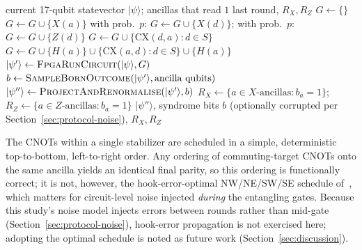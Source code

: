 \documentclass[pdflatex,sn-mathphys,Numbered]{sn-jnl}
\begin{document}
\begin{algorithm}
\caption{One syndrome-extraction round (host-orchestrated, FPGA-executed)}\label{alg:round}
\begin{algorithmic}[1]
\Require current 17-qubit statevector $\lvert\psi\rangle$; ancillas that read $1$ last round, $R_{X}, R_{Z}$
\State $G \gets \{\}$
 
    \State $G \gets G \cup \{X(a)\}$
\EndFor
{}
    \State with prob.\ $p$: $G \gets G \cup \{X(d)\}$; with prob.\ $p$: $G \gets G \cup \{Z(d)\}$ 
\EndFor
{}
    \State $G \gets G \cup \{\mathrm{CX}(d,a) : d \in S\}$ 
\EndFor
{}
    \State $G \gets G \cup \{H(a)\} \cup \{\mathrm{CX}(a,d): d\in S\} \cup \{H(a)\}$ 
\EndFor
\State $\lvert\psi'\rangle \gets \textsc{FpgaRunCircuit}(\lvert\psi\rangle, G)$ 
\State $b \gets \textsc{SampleBornOutcome}(\lvert\psi'\rangle, \text{ancilla qubits})$ 
\State $\lvert\psi''\rangle \gets \textsc{ProjectAndRenormalise}(\lvert\psi'\rangle, b)$
\State $R_{X} \gets \{a\in X\text{-ancillas}: b_a=1\}$; $R_{Z} \gets \{a\in Z\text{-ancillas}: b_a=1\}$
\State \Return $\lvert\psi''\rangle$, syndrome bits $b$ (optionally corrupted per Section~\ref{sec:protocol-noise}), $R_X, R_Z$
\end{algorithmic}
\end{algorithm}

The CNOTs within a single stabilizer are scheduled in a simple, deterministic top-to-bottom, left-to-right order. Any ordering of commuting-target CNOTs onto the same ancilla yields an identical final parity, so this ordering is functionally correct; it is not, however, the hook-error-optimal NW/NE/SW/SE schedule of~\cite{tomita2014,fowler2012}, which matters for circuit-level noise injected \emph{during} the entangling gates. Because this study's noise model injects errors between rounds rather than mid-gate (Section~\ref{sec:protocol-noise}), hook-error propagation is not exercised here; adopting the optimal schedule is noted as future work (Section~\ref{sec:discussion}).
\end{document}
